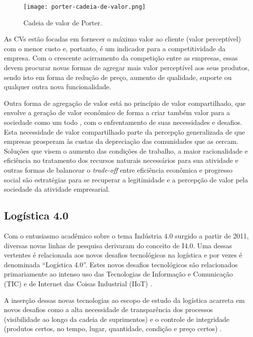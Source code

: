 \begin{figure}[htb]
	\centering
	\texttt{[image: porter-cadeia-de-valor.png]}
	\caption{Cadeia de valor de Porter.}
	\label{fig:porter-cadeia-de-valor}
\end{figure}

As CVs estão focadas em fornecer o máximo valor ao cliente (valor perceptível) com o menor custo e, portanto, é um indicador para a competitividade da empresa. Com o crescente acirramento da competição entre as empresas, essas devem procurar novas formas de agregar mais valor perceptível aos seus produtos, sendo isto em forma de redução de preço, aumento de qualidade, suporte ou qualquer outra nova funcionalidade.

Outra forma de agregação de valor está no princípio de valor compartilhado, que envolve a geração de valor econômico de forma a criar também valor para a sociedade como um todo \cite{porter2011valorcompartilhado}, com o enfrentamento de suas necessidades e desafios. Esta necessidade de valor compartilhado parte da percepção generalizada de que empresas prosperam às custas da depreciação das comunidades que as cercam. Soluções que visem o aumento das condições de trabalho, a maior racionalidade e eficiência no tratamento dos recursos naturais necessários para sua atividade e outras formas de balancear o \textit{trade-off} entre eficiência econômica e progresso social são estratégias para se recuperar a legitimidade e a percepção de valor pela sociedade da atividade empresarial.

\subsection{Logística 4.0}

Com o entusiasmo acadêmico sobre o tema Indústria 4.0 surgido a partir de 2011, diversas novas linhas de pesquisa derivaram do conceito de I4.0. Uma dessas vertentes é relacionada aos novos desafios tecnológicos na logística e por vezes é denominada ``Logística 4.0''. Estes novos desafios tecnológicos são relacionados primariamente ao intenso uso das Tecnologias de Informação e Comunicação (TIC) e de Internet das Coisas Industrial (IIoT) \cite{barreto2017industry}.

A inserção dessas novas tecnologias ao escopo de estudo da logística acarreta em novos desafios como a alta necessidade de transparência dos processos (visibilidade ao longo da cadeia de suprimentos) e o controle de integridade (produtos certos, no tempo, lugar, quantidade, condição e preço certos) \cite{barreto2017industry}.


